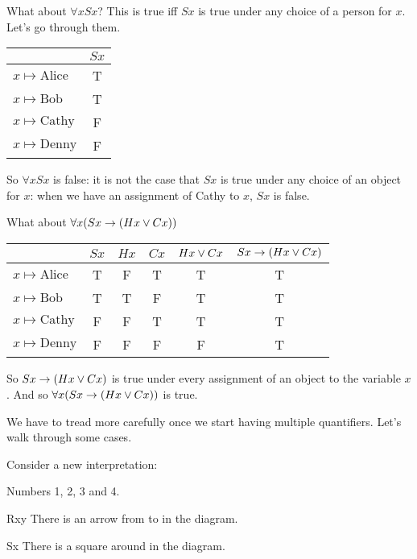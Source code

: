 What about $\forall x Sx$? This is true iff $Sx$ is true under any choice of a person for $x$. Let's go through them. \begin{center}
\begin{tabular}{l|c}
&$Sx$\Bstrut\\\hline\Tstrut
$x\mapsto\text{Alice}$&T\\
$x\mapsto \text{Bob}$&T\\
$x\mapsto \text{Cathy}$&F\\
$x\mapsto \text{Denny}$&F
\end{tabular}
\end{center}So $\forall x Sx$ is false: it is not the case that $Sx$ is true under any choice of an object for $x$: when we have an assignment of Cathy to $x$, $Sx$ is false. 

What about $\forall x(Sx\rightarrow (Hx\vee Cx))$
\begin{center}
\begin{tabular}{l|ccccc}
&$Sx$&$Hx$&$Cx$&$Hx\vee Cx$&$Sx\rightarrow (Hx\vee Cx)$\Bstrut\\\hline\Tstrut
$x\mapsto\text{Alice}$&T&F&T&T&T\\
$x\mapsto \text{Bob}$&T&T&F&T&T\\
$x\mapsto \text{Cathy}$&F&F&T&T&T\\
$x\mapsto \text{Denny}$&F&F&F&F&T
\end{tabular}
\end{center}
So $Sx\rightarrow (Hx\vee Cx)$  is true under every assignment of an object to the variable $x$. And so $\forall x(Sx\rightarrow (Hx\vee Cx))$ is true. 



We have to tread more carefully once we start having multiple quantifiers. Let's walk through some cases.

Consider a new interpretation: \begin{center}

 \begin{ekey}
\item[\text{domain}] Numbers 1, 2, 3 and 4.
\item[Rxy] There is an arrow from  to  in the diagram.
\item[Sx] There is a square around  in the diagram.
\end{ekey}
\end{center}
 

